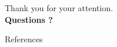 \documentclass[18pt]{beamer}
\begin{document}
\begin{frame}
\vfill
\centering
{\LARGE Thank you for your attention.}\\
\vspace{1cm}
{\Large \textbf{Questions ?}}
\vfill
\end{frame}

\appendix
\beginbackup

\nocite{*}

\begin{frame}[allowframebreaks]{References}
\printbibliography
\end{frame}

\backupend
\end{document}
